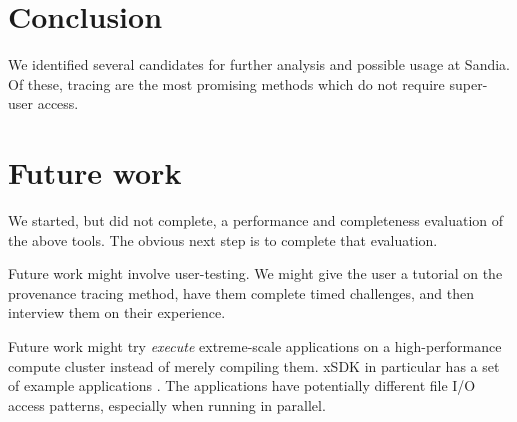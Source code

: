 \section{Conclusion}

We identified several candidates for further analysis and possible usage at Sandia.
Of these, tracing are the most promising methods which do not require super-user access.

\section{Future work}

We started, but did not complete, a performance and completeness evaluation of the above tools.
The obvious next step is to complete that evaluation.

Future work might involve user-testing.
We might give the user a tutorial on the provenance tracing method, have them complete timed challenges, and then interview them on their experience.

Future work might try \textit{execute} extreme-scale applications on a high-performance compute cluster instead of merely compiling them.
xSDK in particular has a set of example applications \cite{bartlett_xsdk_2017}.
The applications have potentially different file I/O access patterns, especially when running in parallel.



